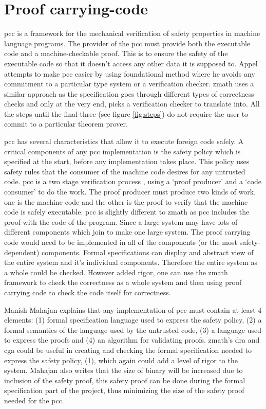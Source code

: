 \section{Proof carrying-code}

\Gls{pcc} is a framework for the mechanical verification of safety properties in machine language programs. The provider of the \gls{pcc} must provide both the executable code and a machine-checkable proof. This is to ensure the safety of the executable code so that it doesn't access any other data it is supposed to. Appel \cite{fpcc} attempts to make \gls{pcc} easier by using foundational method where he avoids any commitment to a particular type system or a verification checker. \gls{zmath} uses a similar approach as the specification goes through different types of correctness checks and only at the very end, picks a verification checker to translate into. All the steps until the final three (see figure \ref{fig:steps}) do not require the user to commit to a particular theorem prover.

\Gls{pcc} has several characteristics that allow it to execute foreign code safely. A critical components of any \gls{pcc} implementation is the safety policy which is specified at the start, before any implementation takes place. This policy uses safety rules that the consumer of the machine code desires for any untrusted code. \Gls{pcc} is a two stage verification process \cite{suappc}, using a `proof producer' and a `code consumer' to do the work. The proof producer must produce two kinds of work, one is the machine code and the other is the proof to verify that the machine code is safely executable. \Gls{pcc} is slightly different to \gls{zmath} as \gls{pcc} includes the proof with the code of the program. Since a large system may have lots of different components which join to make one large system. The proof carrying code would need to be implemented in all of the components (or the most safety-dependent) components. Formal specifications can display and abstract view of the entire system and it's individual components. Therefore the entire system as a whole could be checked. However added rigor, one can use the \gls{zmath} framework to check the correctness as a whole system and then using proof carrying code to check the code itself for correctness.

Manish Mahajan \cite{pccman} explains that any implementation of \gls{pcc} must contain at least 4 elements: (1) formal specification language used to express the safety policy, (2) a formal semantics of the language used by the untrusted code, (3) a language used to express the proofs and (4) an algorithm for validating proofs. \Gls{zmath}'s \gls{dra} and \gls{cga} could be useful in creating and checking the formal specification needed to express the safety policy, (1), which again could add a level of rigor to the system. Mahajan also writes that the size of binary will be increased due to inclusion of the safety proof, this safety proof can be done during the formal specification part of the project, thus minimizing the size of the safety proof needed for the \gls{pcc}.


